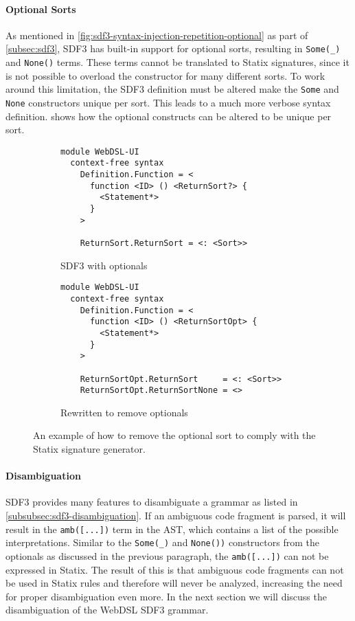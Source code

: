       \paragraph{\label{par:optional-sorts}Optional Sorts} As mentioned in \cref{fig:sdf3-syntax-injection-repetition-optional} as part of \cref{subsec:sdf3}, SDF3 has built-in support for optional sorts, resulting in \texttt{Some(\_)} and \texttt{None()} terms. These terms cannot be  translated to Statix signatures, since it is not possible to overload the constructor for many different sorts. To work around this limitation, the SDF3 definition must be altered make the \texttt{Some} and \texttt{None} constructors unique per sort. This leads to a much more verbose syntax definition.  shows how the optional constructs can be altered to be unique per sort.

      \begin{figure}
        \begin{subfigure}[b]{1\textwidth}
          \begin{verbatim}
module WebDSL-UI
  context-free syntax
    Definition.Function = <
      function <ID> () <ReturnSort?> {
        <Statement*>
      }
    >

    ReturnSort.ReturnSort = <: <Sort>>
          \end{verbatim}
          \caption{\label{fig:sdf3-remove-optionals-before}SDF3 with optionals}
        \end{subfigure}
        \begin{subfigure}[b]{1\textwidth}
          \begin{verbatim}
module WebDSL-UI
  context-free syntax
    Definition.Function = <
      function <ID> () <ReturnSortOpt> {
        <Statement*>
      }
    >

    ReturnSortOpt.ReturnSort     = <: <Sort>>
    ReturnSortOpt.ReturnSortNone = <>
          \end{verbatim}
          \caption{\label{fig:sdf3-remove-optionals-after}Rewritten to remove optionals}
        \end{subfigure}
      \caption{\label{fig:sdf3-remove-optionals}An example of how to remove the optional sort to comply with the Statix signature generator.}
      \end{figure}

      \paragraph{Disambiguation} SDF3 provides many features to disambiguate a grammar as listed in \cref{subsubsec:sdf3-disambiguation}. If an ambiguous code fragment is parsed, it will result in the \texttt{amb([...])} term in the AST, which contains a list of the possible interpretations. Similar to the \texttt{Some(\_)} and \texttt{None())} constructors from the optionals as discussed in the previous paragraph, the \texttt{amb([...])} can not be expressed in Statix. The result of this is that ambiguous code fragments can not be used in Statix rules and therefore will never be analyzed, increasing the need for proper disambiguation even more. In the next section we will discuss the disambiguation of the WebDSL SDF3 grammar.

